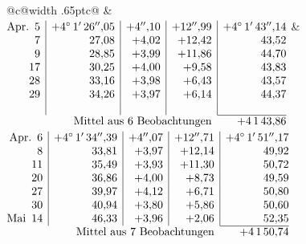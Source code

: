 \noindent\begin{tabular}{@{}c@{\hspace{.4em}\vrule width .65pt\hspace{.4em}}c@{}}
 &
 \\[.18ex]
\(\begin{array}[t]{@{}r|r|r|r|r@{}}
\text{Apr.}\enspace 5 & +4^\circ\,1'\,26''{,}05 & +4''{,}10 & +12''{,}99 & +4^\circ\,1'\,43''{,}14\\
7 & 27{,}08 & +4{,}02 & +12{,}42 & 43{,}52\\
9 & 28{,}85 & +3{,}99 & +11{,}86 & 44{,}70\\
17 & 30{,}25 & +4{,}00 & +9{,}58 & 43{,}83\\
28 & 33{,}16 & +3{,}98 & +6{,}43 & 43{,}57\\
29 & 34{,}26 & +3{,}97 & +6{,}14 & 44{,}37\\
 & & & & \\
\cline{5-5}
\multicolumn{4}{r}{\text{Mittel aus 6 Beobachtungen}} & +4\,1\,43{,}86
\end{array}\)
&
\(\begin{array}[t]{@{}r|r|r|r|r@{}}
\text{Apr.}\enspace 6 & +4^\circ\,1'\,34''{,}39 & +4''{,}07 & +12''{,}71 & +4^\circ\,1'\,51''{,}17\\
8 & 33{,}81 & +3{,}97 & +12{,}14 & 49{,}92\\
11 & 35{,}49 & +3{,}93 & +11{,}30 & 50{,}72\\
20 & 36{,}86 & +4{,}00 & +8{,}73 & 49{,}59\\
27 & 39{,}97 & +4{,}12 & +6{,}71 & 50{,}80\\
30 & 40{,}94 & +3{,}80 & +5{,}86 & 50{,}60\\
\text{Mai}\enspace 14 & 46{,}33 & +3{,}96 & +2{,}06 & 52{,}35\\
\cline{5-5}
\multicolumn{4}{r}{\text{Mittel aus 7 Beobachtungen}} & +4\,1\,50{,}74
\end{array}\)
\end{tabular}\par\medskip
